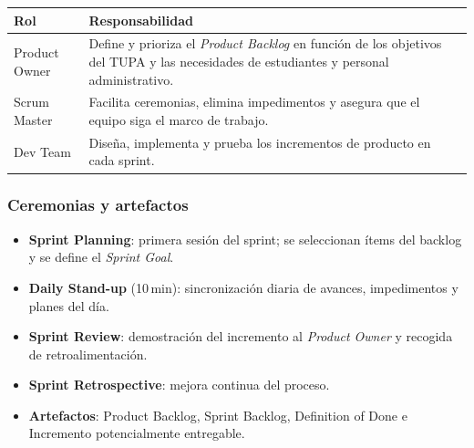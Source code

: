 \begin{center}
\begin{tabular}{p{3.5cm} p{9.5cm}}
  \toprule
  \rowcolor{unsaacRed}
  \color{white}\textbf{Rol} & \color{white}\textbf{Responsabilidad} \\
  \midrule
  Product Owner   & Define y prioriza el \textit{Product Backlog} en función de los
                    objetivos del TUPA y las necesidades de estudiantes y personal
                    administrativo. \\
  Scrum Master    & Facilita ceremonias, elimina impedimentos y asegura que el equipo
                    siga el marco de trabajo. \\
  Dev Team        & Diseña, implementa y prueba los incrementos de producto en cada
                    sprint. \\
  \bottomrule
\end{tabular}
\end{center}

\subsubsection{Ceremonias y artefactos}

\begin{itemize}
  \item \textbf{Sprint Planning}: primera sesión del sprint; se seleccionan ítems
    del backlog y se define el \textit{Sprint Goal}.
  \item \textbf{Daily Stand-up} (10\,min): sincronización diaria de avances,
    impedimentos y planes del día.
  \item \textbf{Sprint Review}: demostración del incremento al \textit{Product
    Owner} y recogida de retroalimentación.
  \item \textbf{Sprint Retrospective}: mejora continua del proceso.
  \item \textbf{Artefactos}: Product Backlog, Sprint Backlog, Definition of Done
    e Incremento potencialmente entregable.
\end{itemize}

